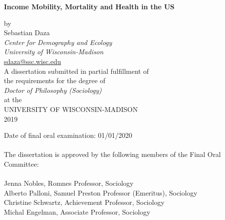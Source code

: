 \documentclass[12pt]{report}
\begin{document}

\thispagestyle{empty}

\renewcommand{\baselinestretch}{1}

\vspace*{60pt}

\begin{center}
\LARGE \textbf{Income Mobility, Mortality and Health in the US} \\
\vspace*{24pt}


\end{center}

\begin{center}
\normalsize
by \\
\vspace*{12pt}
Sebastian Daza \\
\textit{Center for Demography and Ecology \\University of Wisconsin-Madison}\\
\url{sdaza@ssc.wisc.edu}\\
\vspace*{40pt}
A dissertation submitted in partial fulfillment of \\
the requirements for the degree of\\
\vspace{12pt}
\textit{Doctor of Philosophy (Sociology)} \\
\vspace{12pt}
at the \\
\vspace{12pt}
UNIVERSITY OF WISCONSIN‐MADISON \\
\vspace{12pt}
2019
\end{center}

\vspace{60pt}
\noindent Date of final oral examination: 01/01/2020\\
\\
\noindent The dissertation is approved by the following members of the Final Oral Committee:\\
\\
\noindent Jenna Nobles, Romnes Professor, Sociology \\
\noindent Alberto Palloni, Samuel Preston Professor (Emeritus), Sociology\\
\noindent Christine Schwartz, Achievement Professor, Sociology\\
\noindent Michal Engelman, Associate Professor, Sociology
\end{document}
